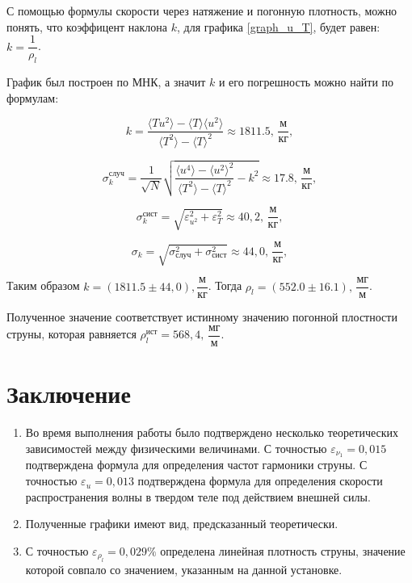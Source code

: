 \documentclass[
a4paper, %
12pt, %
]{article}
\begin{document}
	С помощью формулы скорости через натяжение и погонную плотность, можно понять, что коэффицент наклона $k$, для графика \ref{graph_u_T}, будет равен: $k = \dfrac{1}{\rho_l}$.
	
	График был построен по МНК, а значит $k$ и его погрешность можно найти по формулам:
	
	\begin{equation}
		k=\frac{\langle Tu^2\rangle-\langle T\rangle \langle u^2\rangle}{\langle T^2\rangle - \langle T\rangle^2} \approx 1811.5 \text{, $\dfrac{\text{м}}{\text{кг}}$},
	\end{equation}
	
	\begin{equation}
		\sigma_k^\text{случ}=\frac{1}{\sqrt{N}}\sqrt{\frac{\langle u^4 \rangle - \langle u^2 \rangle^2}{\langle T^2 \rangle - \langle T \rangle^2} - k^2  } \approx 17.8 \text{, $\dfrac{\text{м}}{\text{кг}}$},
	\end{equation}
	
	\begin{equation}
		\sigma_k^{\text{сист}} = \sqrt{ \varepsilon_{u^2}^2 + \varepsilon_T^2 } \approx 40,2\text{, $\dfrac{\text{м}}{\text{кг}}$},
	\end{equation}
	
	\begin{equation}
		\sigma_k = \sqrt{\sigma_\text{случ}^2 + \sigma_\text{сист}^2} \approx 44,0 \text{, $\dfrac{\text{м}}{\text{кг}}$},
	\end{equation}
	
	Таким образом $k = (1811.5 \pm 44,0) {, \dfrac{\text{м}}{\text{кг}}} $.
	Тогда $\rho_l = (552.0 \pm 16.1) \text{, $\dfrac{\text{мг}}{\text{м}}$}$.
	
	Полученное значение соответствует истинному значению погонной плостности струны, которая равняется $\rho^{\text{ист}}_l = 568,4\text{, $\dfrac{\text{мг}}{\text{м}}$} $. 
	
	\newpage
	
	\section{Заключение}
	\begin{enumerate}
		\item Во время выполнения работы было подтверждено несколько теоретических зависимостей между физическими величинами. С точностью $\varepsilon_{\nu_{1}} = 0,015$ подтверждена формула для определения частот гармоники струны. С точностью  $\varepsilon_{u} = 0,013$ подтверждена формула для определения скорости распространения волны в твердом теле под действием внешней силы.
		\item Полученные графики имеют вид, предсказанный теоретически.
		\item С точностью $ \varepsilon_{\rho_{l}} = 0,029 \%$ определена линейная плотность струны, значение которой совпало со значением, указанным на данной установке.
	\end{enumerate}
	
	
\end{document}
